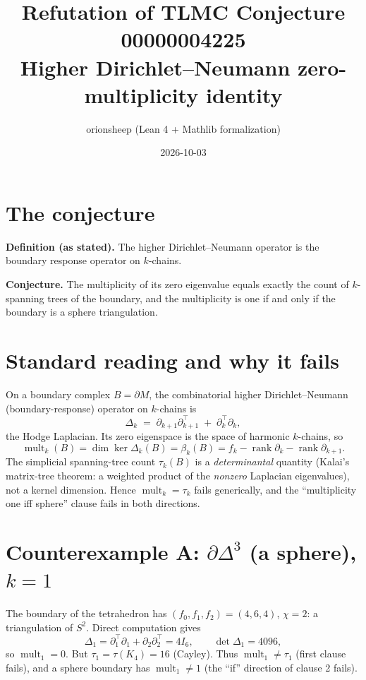 \documentclass[11pt]{article}
\title{Refutation of TLMC Conjecture 00000004225\\
\large Higher Dirichlet--Neumann zero-multiplicity identity}
\author{orionsheep (Lean 4 + Mathlib formalization)}
\date{2026-10-03}
\begin{document}
\maketitle

\section*{The conjecture}
\noindent\textbf{Definition (as stated).} The higher Dirichlet--Neumann operator
is the boundary response operator on $k$-chains.

\noindent\textbf{Conjecture.} The multiplicity of its zero eigenvalue equals
exactly the count of $k$-spanning trees of the boundary, and the multiplicity
is one if and only if the boundary is a sphere triangulation.

\section*{Standard reading and why it fails}
On a boundary complex $B=\partial M$, the combinatorial higher
Dirichlet--Neumann (boundary-response) operator on $k$-chains is
\[
\Delta_k \;=\; \partial_{k+1}\partial_{k+1}^{\!\top}
             \;+\; \partial_k^{\!\top}\partial_k ,
\]
the Hodge Laplacian. Its zero eigenspace is the space of harmonic $k$-chains,
so
\[
\operatorname{mult}_k(B)=\dim\ker\Delta_k(B)=\beta_k(B)
   = f_k-\operatorname{rank}\partial_k-\operatorname{rank}\partial_{k+1}.
\]
The simplicial spanning-tree count $\tau_k(B)$ is a \emph{determinantal}
quantity (Kalai's matrix-tree theorem: a weighted product of the
\emph{nonzero} Laplacian eigenvalues), not a kernel dimension. Hence
$\operatorname{mult}_k=\tau_k$ fails generically, and the ``multiplicity one
iff sphere'' clause fails in both directions.

\section*{Counterexample A: $\partial\Delta^3$ (a sphere), $k=1$}
The boundary of the tetrahedron has $(f_0,f_1,f_2)=(4,6,4)$, $\chi=2$: a
triangulation of $S^2$. Direct computation gives
\[
\Delta_1 = \partial_1^{\top}\partial_1+\partial_2\partial_2^{\top}=4I_6,
\qquad \det\Delta_1=4096,
\]
so $\operatorname{mult}_1=0$. But $\tau_1=\tau(K_4)=16$ (Cayley). Thus
$\operatorname{mult}_1\neq\tau_1$ (first clause fails), and a sphere boundary
has $\operatorname{mult}_1\neq 1$ (the ``if'' direction of clause 2 fails).
\end{document}
